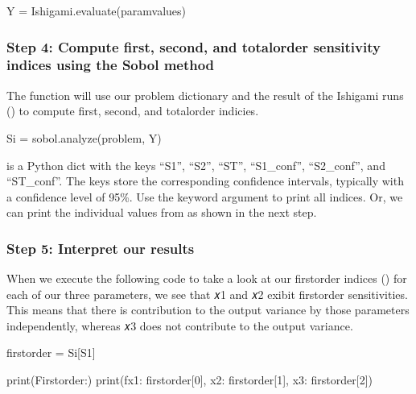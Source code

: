 \documentclass[letterpaper,10pt,english]{book}
\begin{document}
\begin{sphinxVerbatim}[commandchars=\\\{\}]
Y = Ishigami.evaluate(param\PYGZus{}values)
\end{sphinxVerbatim}


\subsubsection{Step 4: Compute first\sphinxhyphen{}, second\sphinxhyphen{}, and total\sphinxhyphen{}order sensitivity indices using the Sobol method}
\label{\detokenize{A2_Jupyter_Notebooks:step-4-compute-first-second-and-total-order-sensitivity-indices-using-the-sobol-method}}
\sphinxAtStartPar
The  function will use our problem dictionary and the
result of the Ishigami runs () to compute first\sphinxhyphen{}, second\sphinxhyphen{}, and
total\sphinxhyphen{}order indicies.

\begin{sphinxVerbatim}[commandchars=\\\{\}]
Si = sobol.analyze(problem, Y)
\end{sphinxVerbatim}

\sphinxAtStartPar
{} is a Python dict with the keys “S1”, “S2”, “ST”, “S1\_conf”,
“S2\_conf”, and “ST\_conf”. The  keys store the corresponding
confidence intervals, typically with a confidence level of 95\%. Use the
keyword argument  to print all indices. Or, we
can print the individual values from  as shown in the next step.


\subsubsection{Step 5: Interpret our results}
\label{\detokenize{A2_Jupyter_Notebooks:step-5-interpret-our-results}}
\sphinxAtStartPar
When we execute the following code to take a look at our first\sphinxhyphen{}order
indices () for each of our three parameters, we see that 𝑥1 and 𝑥2
exibit first\sphinxhyphen{}order sensitivities. This means that there is contribution
to the output variance by those parameters independently, whereas 𝑥3
does not contribute to the output variance.

\begin{sphinxVerbatim}[commandchars=\\\{\}]
first\PYGZus{}order = Si[\PYGZsq{}S1\PYGZsq{}]

print(\PYGZsq{}First\PYGZhy{}order:\PYGZsq{})
print(f\PYGZdq{}x1: \PYGZob{}first\PYGZus{}order[0]\PYGZcb{}, x2: \PYGZob{}first\PYGZus{}order[1]\PYGZcb{}, x3: \PYGZob{}first\PYGZus{}order[2]\PYGZcb{}\PYGZdq{})
\end{sphinxVerbatim}
\end{document}
